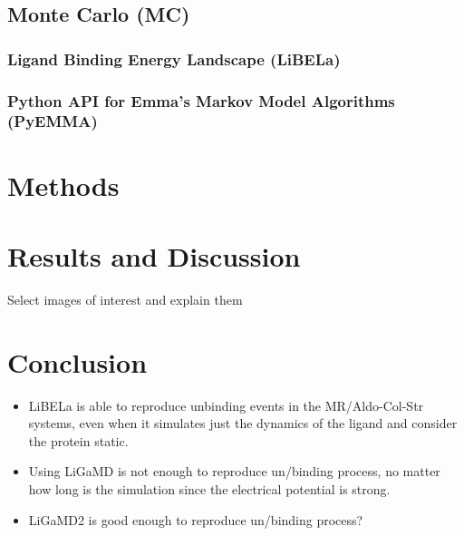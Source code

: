 \documentclass[letter,10pt, twocolumn]{article}
\begin{document}
\subsection{Monte Carlo (MC)}


\subsubsection*{\textbf{Ligand Binding Energy Landscape  (LiBELa)
}}
\cite{libela}

\subsubsection*{\textbf{Python API for Emma's Markov Model Algorithms (PyEMMA)}}


\cite{pyemma}


\section{Methods}





\section{Results and Discussion}

Select images of interest and explain them


\section{Conclusion}


\begin{itemize}

\item LiBELa  is able to reproduce unbinding events in the MR/Aldo-Col-Str systems, even when it simulates just the dynamics of the ligand and consider the protein static.

\item Using LiGaMD is not enough to reproduce un/binding process, no matter how long is the simulation since the electrical potential is strong. 

\item LiGaMD2 is good enough to reproduce un/binding process?

\end{itemize}


\clearpage
\onecolumn{


}
\end{document}
